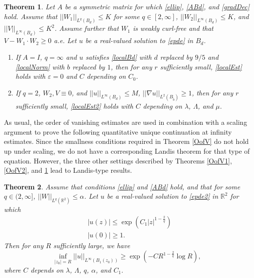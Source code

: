 \documentclass[12pt,reqno]{amsart}
\theoremstyle{plain}
\newtheorem{thm}{Theorem}
\theoremstyle{definition}
\newcommand{\eps}{\varepsilon}
\newcommand{\al}{\alpha}
\newcommand{\la}{\lambda}
\newcommand{\La}{\Lambda}
\newcommand{\iny}{\infty}
\newcommand{\gr}{\nabla}
\newcommand{\norm}[1]{\left\vert \left\vert #1\right\vert\right\vert}
\newcommand{\abs}[1]{\left\vert#1\right\vert}
\newcommand{\pr}[1]{\left( #1 \right) }
\newcommand{\R}{\ensuremath{\mathbb{R}}}
\begin{document}
\begin{thm}
\label{OofV3}
Let $A$ be a symmetric matrix for which \eqref{ellip}, \eqref{ABd}, and \eqref{gradDec} hold.
Assume that $\norm{W_1}_{L^{q}\pr{B_d}} \le K$ for some $q \in [2,\iny]$, $\norm{W_2}_{L^{\iny}\pr{B_d}} \le K$, and $\norm{V}_{L^{\iny}\pr{B_d}} \le K^2$.
Assume further that $W_1$ is weakly curl-free and that $V - W_1 \cdot W_2 \ge 0$ a.e.
Let $u$ be a real-valued solution to \eqref{epde} in $B_d$.
\begin{enumerate}
\item[{\rm (a)}] If $A = I$, $q = \iny$ and $u$ satisfies \eqref{localBd} with $d$ replaced by $9/5$ and \eqref{localNorm} with $b$ replaced by $1$, then for any $r$ sufficiently small, \eqref{localEst} holds with $\eps = 0$ and $C$ depending on $C_0$.
\item[{\rm (b)}] If $q = 2$, $W_2, V \equiv 0$, and $\norm{u}_{L^\iny\pr{B_d}} \le M$, $\norm{\gr u}_{L^2\pr{B_{\tilde b}}} \ge 1$, then for any $r$ sufficiently small, \eqref{localEst2} holds with $C$ depending on $\la$, $\La$, and $\mu$.
\end{enumerate}
\end{thm}

As usual, the order of vanishing estimates are used in combination with a scaling argument to prove the following quantitative unique continuation at infinity estimates.
Since the smallness conditions required in Theorem \ref{OofV} do not hold up under scaling, we do not have a corresponding Landis theorem for that type of equation.
However, the three other settings described by Theorems \ref{OofV1}, \ref{OofV2}, and \ref{OofV3} lead to Landis-type results.

\begin{thm}
\label{LandisThm}
Assume that conditions \eqref{ellip} and \eqref{ABd} hold, and that for some $q \in (2, \iny]$, $\norm{W}_{L^{q}\pr{\R^2}} \le \al$.
Let $u$ be a real-valued solution to \eqref{epde2} in $\R^2$ for which
\begin{align}
& \abs{u\pr{z}} \le \exp\pr{C_1 \abs{z}^{1 - \frac 2 {q}}}
\label{uBd} \\
& \abs{u\pr{0}} \ge 1.
\label{normed}
\end{align}
Then for any $R$ sufficiently large, we have
\begin{equation}
\inf_{\abs{z_0} = R} \norm{u}_{L^\iny\pr{B_1\pr{z_0}}} \ge \exp\pr{- C R^{1 - \frac 2 {q}} \log R},
\label{globalEst}
\end{equation}
where $C$ depends on $\la$, $\La$, $q$, $\al$, and $C_1$.
\end{thm}
\end{document}
